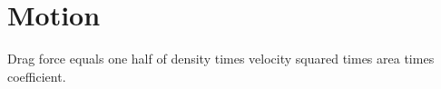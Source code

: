 \section{Motion}\label{eq:drag}
Drag force equals one half of density times velocity squared times area times coefficient.
